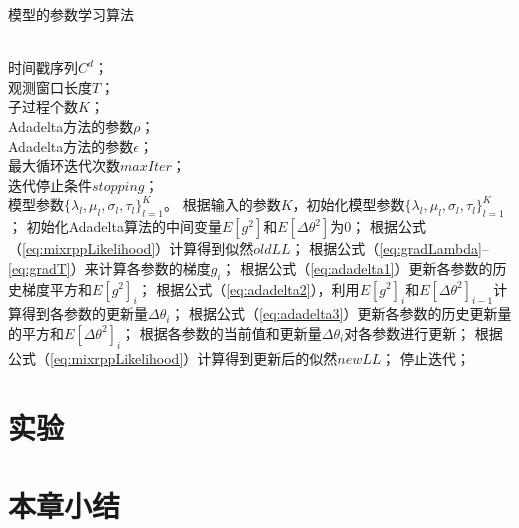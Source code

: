\begin{algorithm}  
\caption{模型的参数学习算法}  
\label{alg:mixrppUpdate}  
\begin{algorithmic}[1]  
	\REQUIRE ~~\\
		时间戳序列$C^d$；\\
		观测窗口长度$T$；\\
		子过程个数$K$；\\
		Adadelta方法的参数$\rho$；\\
		Adadelta方法的参数$\epsilon$；\\
		最大循环迭代次数$maxIter$；\\
		迭代停止条件$stopping$；	
	\ENSURE ~~\\
		模型参数$\{\lambda_l,\mu_l,\sigma_l,\tau_l\}_{l=1}^K$。
	\vspace{2ex}
	\STATE 根据输入的参数$K$，初始化模型参数$\{\lambda_l,\mu_l,\sigma_l,\tau_l\}_{l=1}^K$；
	\STATE 初始化Adadelta算法的中间变量$E[g^2]$和$E[\Delta\theta^2]$为0；
	\STATE 根据公式（\ref{eq:mixrppLikelihood}）计算得到似然$oldLL$；
		\STATE 根据公式（\ref{eq:gradLambda}--\ref{eq:gradT}）来计算各参数的梯度$g_i$；
		\STATE 根据公式（\ref{eq:adadelta1}）更新各参数的历史梯度平方和$E[g^2]_i$；
		\STATE 根据公式（\ref{eq:adadelta2}），利用$E[g^2]_i$和$E[\Delta\theta^2]_{i-1}$计算得到各参数的更新量$\Delta\theta_i$；
		\STATE 根据公式（\ref{eq:adadelta3}）更新各参数的历史更新量的平方和$E[\Delta\theta^2]_i$；
		\STATE 根据各参数的当前值和更新量$\Delta\theta_i$对各参数进行更新；
		\STATE 根据公式（\ref{eq:mixrppLikelihood}）计算得到更新后的似然$newLL$；
			\STATE 停止迭代；
		\ENDIF
	\ENDFOR
\end{algorithmic}  
\end{algorithm}  

\section{实验}
\section{本章小结}